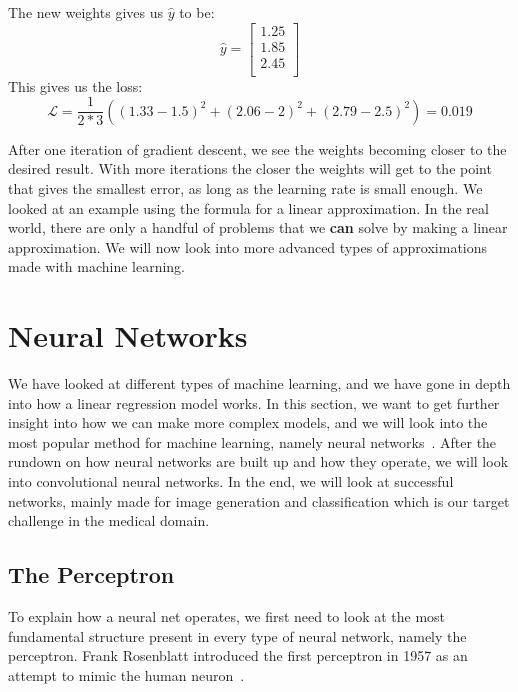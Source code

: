 \noindent The new weights gives us $\hat{y}$ to be:
\begin{equation}
    \hat{y}=\left[\begin{array}{c} 1.25\\ 1.85\\ 2.45\\ \end{array}\right]
\end{equation}
This gives us the loss:
\begin{equation}
   \mathcal{L} = \frac{1}{2*3} \left( {(1.33-1.5)}^2+{(2.06-2)}^2+{(2.79-2.5)}^2 \right) = 0.019
\end{equation}

\noindent After one iteration of gradient descent, we see the weights becoming closer to the desired result. With more iterations the closer the weights will get to the point that gives the smallest error, as long as the learning rate is small enough. 
We looked at an example using the formula for a linear approximation. In the real world, there are only a handful of problems that we \textbf{can} solve by making a linear approximation. We will now look into more advanced types of approximations made with machine learning.

    

\section{Neural Networks}
We have looked at different types of machine learning, and we have gone in depth into how a linear regression model works. In this section, we want to get further insight into how we can make more complex models, and we will look into the most popular method for machine learning, namely neural networks~\cite{haykin1994neural}. 
After the rundown on how neural networks are built up and how they operate, we will look into convolutional neural networks. In the end, we will look at successful networks, mainly made for image generation and classification which is our target challenge in the medical domain. 


\subsection{The Perceptron}
\label{cha:perceptron}
To explain how a neural net operates, we first need to look at the most fundamental structure present in every type of neural network, namely the perceptron.
Frank Rosenblatt introduced the first perceptron in 1957 as an attempt to mimic the human neuron~\cite{perceptron}.  


